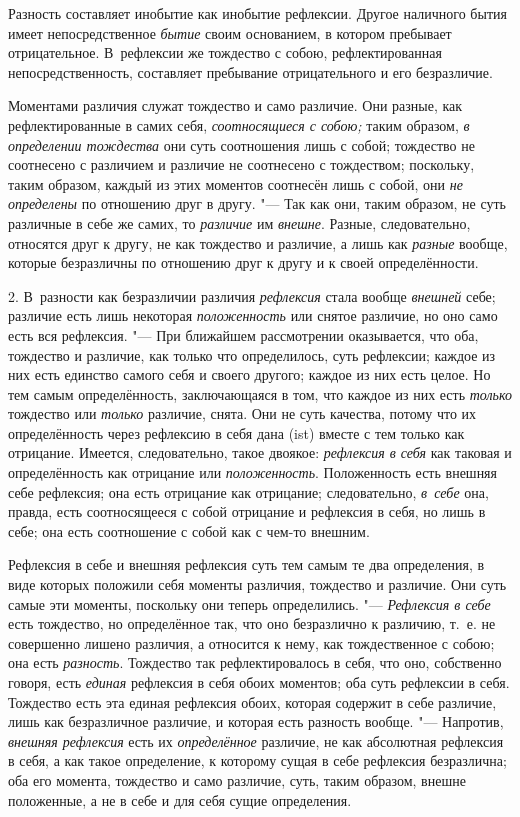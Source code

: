 Разность составляет инобытие как инобытие рефлексии. Другое наличного бытия
имеет непосредственное {\em бытие} своим основанием, в
котором пребывает отрицательное. В~рефлексии же тождество с собою,
рефлектированная непосредственность, составляет пребывание отрицательного и
его безразличие.

Моментами различия служат тождество и само различие. Они разные, как
рефлектированные в самих себя, {\em соотносящиеся с
собою;} таким образом, {\em в определении тождества}
они суть соотношения лишь с собой; тождество не соотнесено с различием и
различие не соотнесено с тождеством; поскольку, таким образом, каждый из
этих моментов соотнесён лишь с собой, они {\em не
определены} по отношению друг в другу. "--- Так как они, таким образом, не
суть различные в себе же самих, то {\em различие} им
{\em внешне}. Разные, следовательно, относятся друг к
другу, не как тождество и различие, а лишь как
{\em разные} вообще, которые безразличны по отношению
друг к другу и к своей определённости.

2. В~разности как безразличии различия {\em рефлексия}
стала вообще {\em внешней} себе; различие есть лишь
некоторая {\em положенность} или снятое различие, но
оно само есть вся рефлексия. "--- При ближайшем рассмотрении оказывается, что
оба, тождество и различие, как только что определилось, суть рефлексии;
каждое из них есть единство самого себя и своего другого; каждое из них
есть целое. Но тем самым определённость, заключающаяся в том, что каждое из
них есть {\em только} тождество или
{\em только} различие, снята. Они не суть качества,
потому что их определённость через рефлексию в себя дана (ist) вместе с тем
только как отрицание. Имеется, следовательно, такое двоякое:
{\em рефлексия в себя} как таковая и определённость
как отрицание или {\em положенность}. Положенность есть
внешняя себе рефлексия; она есть отрицание как отрицание; следовательно,
{\em в~себе} она, правда, есть соотносящееся с собой
отрицание и рефлексия в себя, но лишь в себе; она есть соотношение с собой
как с чем-то внешним.

Рефлексия в себе и внешняя рефлексия суть тем самым те два определения, в
виде которых положили себя моменты различия, тождество и различие. Они суть
самые эти моменты, поскольку они теперь определились. "---
{\em Рефлексия в себе} есть тождество, но определённое
так, что оно безразлично к различию, т.~е. не совершенно лишено различия, а
относится к нему, как тождественное с собою; она есть
{\em разность}. Тождество так рефлектировалось в себя,
что оно, собственно говоря, есть {\em единая} рефлексия
в себя обоих моментов; оба суть рефлексии в себя. Тождество есть эта единая
рефлексия обоих, которая содержит в себе различие, лишь как безразличное
различие, и которая есть разность вообще. "--- Напротив,
{\em внешняя рефлексия} есть их
{\em определённое} различие, не как абсолютная
рефлексия в себя, а как такое определение, к которому сущая в себе
рефлексия безразлична; оба его момента, тождество и само различие, суть,
таким образом, внешне положенные, а не в себе и для себя сущие определения.

